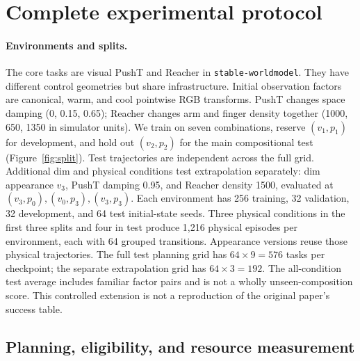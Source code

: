 \section{Complete experimental protocol}
\label{sec:protocol-details}
\paragraph{Environments and splits.}
The core tasks are visual PushT and Reacher in \texttt{stable-worldmodel}.
They have different control geometries but share infrastructure. Initial
observation factors are canonical, warm, and cool pointwise RGB transforms.
PushT changes space damping (0, 0.15, 0.65); Reacher changes arm and finger
density together (1000, 650, 1350 in simulator units). We train on seven
combinations, reserve $(v_1,p_1)$ for development, and hold out $(v_2,p_2)$
for the main compositional test (Figure~\ref{fig:split}). Test trajectories
are independent across the full grid. Additional dim and physical conditions
test extrapolation separately: dim appearance $v_3$, PushT damping 0.95,
and Reacher density 1500, evaluated at $(v_3,p_0),(v_0,p_3),(v_3,p_3)$.
Each environment has 256 training, 32 validation, 32 development, and 64 test
initial-state seeds. Three physical conditions in the first three splits and
four in test produce 1,216 physical episodes per environment, each with
64 grouped transitions. Appearance versions reuse those physical trajectories.
The full test planning grid has $64\times9=576$ tasks per checkpoint;
the separate extrapolation grid has $64\times3=192$. The all-condition test
average includes familiar factor pairs and is not a wholly unseen-composition
score. This controlled extension is not a reproduction of the original paper's
success table.

\subsection{Planning, eligibility, and resource measurement}
